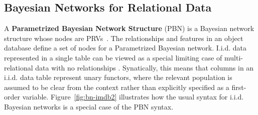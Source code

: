 {{			\subsection{Bayesian Networks for Relational Data}
			
			A \textbf{Parametrized Bayesian Network Structure} (PBN) 
			is a Bayesian network structure  whose nodes are PRVs~\citep{Poole2003}. 
			The relationships and features in an object database define a set of nodes for a Parametrized Bayesian network. I.i.d. data represented in a single table
can be viewed as a special limiting case of multi-relational data with no relationships \citep{Nickel2016}. Synatically, this means that columns in an i.i.d. data table represent unary functors, where the relevant population is assumed to be clear from the context rather than explicitly specified as a first-order variable. Figure~\ref{fig:bn-imdb2} illustrates how the usual syntax for i.i.d. Bayesian networks is a special case of the PBN syntax.

}}
